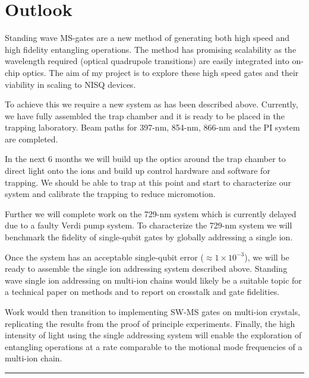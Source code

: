 \documentclass[12pt]{iopart}
\begin{document}

\section{Outlook}
Standing wave MS-gates are a new method of generating both high speed
and high fidelity entangling operations. The method has promising
scalability as the wavelength required (optical quadrupole
transitions) are easily integrated into on-chip optics.
The aim of my project is to explore these high speed gates and their
viability in scaling to NISQ devices.

To achieve this we require a new system as has been described above.
Currently, we have fully assembled the trap chamber and it is ready to be placed
in the trapping laboratory.  Beam paths for 397-nm, 854-nm, 866-nm and
the PI system are completed.

In the next 6 months we will build up the optics around the trap
chamber to direct light onto the ions and build up control hardware
and software for trapping. We should be able to trap at this point and
start to characterize our system and calibrate the trapping to reduce
micromotion.

Further we will complete work on the 729-nm system which is currently
delayed due to a faulty Verdi pump system. To characterize the 729-nm
system we will benchmark the fidelity of single-qubit gates by
globally addressing a single ion.

Once the system has an acceptable single-qubit error
($\approx 1\times10^{-3}$), we will be ready to assemble the single ion
addressing system described above. Standing wave single ion addressing
on multi-ion chains would likely be a suitable topic for a technical
paper on methods and to report on crosstalk and gate fidelities.

Work would then transition to implementing SW-MS gates
on multi-ion crystals, replicating the results from the proof of
principle experiments. Finally, the high intensity of light using the
single addressing system will enable the exploration of entangling
operations at a rate comparable to the motional mode frequencies of a
multi-ion chain.

\vspace{2em}
\hrule
\clearpage

\printbibliography

\clearpage
\end{document}
